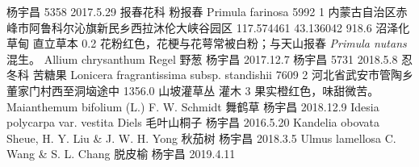 \documentclass[autoduplicate]{nanicolle}
\begin{document}
	杨宇昌	5358	2017.5.29	报春花科	粉报春	Primula farinosa	5992	1	内蒙古自治区赤峰市阿鲁科尔沁旗新民乡西拉沐伦大峡谷园区	117.574461	43.136042	918.6	沼泽化草甸	直立草本	0.2		花粉红色，花梗与花萼常被白粉；与天山报春 \textit{Primula nutans} 混生。
	Allium chrysanthum Regel	野葱	杨宇昌		2017.12.7	
	杨宇昌	5731	2018.5.8	忍冬科	苦糖果	Lonicera fragrantissima subsp. standishii	7609	2	河北省武安市管陶乡董家门村西至洞垴途中			1356.0	山坡灌草丛	灌木	3		果实橙红色，味甜微苦。
	Maianthemum bifolium (L.) F. W. Schmidt	舞鹤草	杨宇昌		2018.12.9	
\Identify		Idesia polycarpa var. vestita Diels	毛叶山桐子	杨宇昌		2016.5.20	
	Kandelia obovata Sheue, H. Y. Liu & J. W. H. Yong	秋茄树	杨宇昌		2018.3.5	
	Ulmus lamellosa C. Wang & S. L. Chang	脱皮榆	杨宇昌		2019.4.11	
\end{document}
